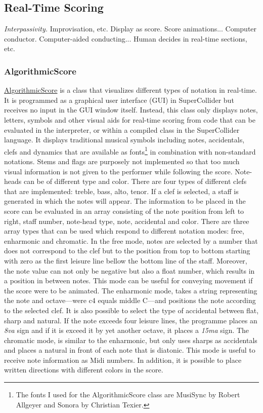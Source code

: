 \subsection{Real-Time Scoring}

\emph{Interpassivity.} Improvisation, etc.
Display as score. Score animations...
Computer conductor.
Computer-aided conducting... Human decides in real-time sections, etc.

\subsubsection{AlgorithmicScore}

\href{http://github.com/freuben/FedeLib/blob/master/AlgorithmicScore/AlgorithmicScore.sc}{AlgorithmicScore} is a class that visualizes different types of notation in real-time. It is programmed as a graphical user interface (GUI) in SuperCollider but receives no input in the GUI window itself. Instead, this class only displays notes, letters, symbols and other visual aids for real-time scoring from code that can be evaluated in the interpreter, or within a compiled class in the SuperCollider language. It displays traditional musical symbols including notes, accidentals, clefs and dynamics that are available as fonts\footnote{The fonts I used for the AlgorithmicScore class are MusiSync by Robert Allgeyer and Sonora by Christian Texier.} in combination with non-standard notations. Stems and flags are purposely not implemented so that too much visual information is not given to the performer while following the score. Note-heads can be of different type and color. There are four types of different clefs that are implemented: treble, bass, alto, tenor.  If a clef is selected, a staff is generated in which the notes will appear. The information to be placed in the score can be evaluated in an array consisting of the note position from left to right, staff number, note-head type, note, accidental and color. There are three array types that can be used which respond to different notation modes: free, enharmonic and chromatic. In the free mode, notes are selected by a number that does not correspond to the clef but to the position from top to bottom starting with zero as the first leisure line bellow the bottom line of the staff. Moreover, the note value can not only be negative but also a float number, which results in a position in between notes. This mode can be useful for conveying movement if the score were to be animated. The enharmonic mode, takes a string representing the note and octave---were c4 equals middle C---and positions the note according to the selected clef. It is also possible to select the type of accidental between flat, sharp and natural. If the note exceeds four leisure lines, the programme places an \emph{8va} sign and if it is exceed it by yet another octave, it places a \emph{15ma} sign. The chromatic mode, is similar to the enharmonic, but only uses sharps as accidentals and places a natural in front of each note that is diatonic. This mode is useful to receive note information as Midi numbers. In addition, it is possible to place written directions with different colors in the score.

